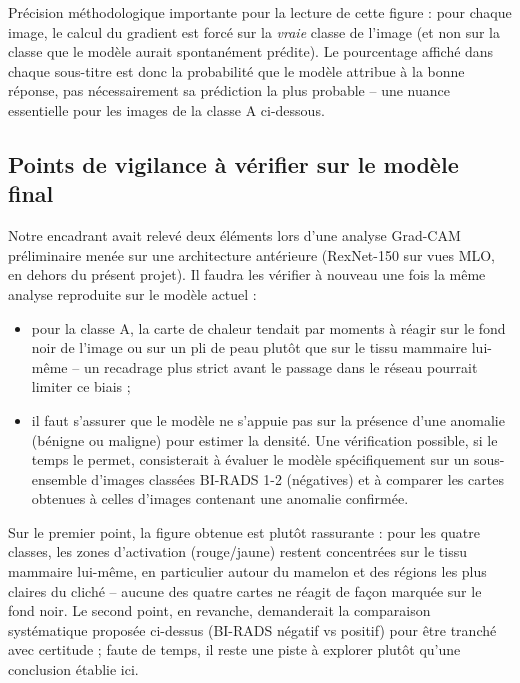 \documentclass[12pt,a4paper]{report}
\begin{document}
Précision méthodologique importante pour la lecture de cette figure : pour
chaque image, le calcul du gradient est forcé sur la \emph{vraie} classe de
l'image (et non sur la classe que le modèle aurait spontanément prédite).
Le pourcentage affiché dans chaque sous-titre est donc la probabilité que
le modèle attribue à la bonne réponse, pas nécessairement sa prédiction la
plus probable -- une nuance essentielle pour les images de la classe A
ci-dessous.

\subsection{Points de vigilance à vérifier sur le modèle final}

Notre encadrant avait relevé deux éléments lors d'une analyse Grad-CAM
préliminaire menée sur une architecture antérieure (RexNet-150 sur vues
MLO, en dehors du présent projet). Il faudra les vérifier à nouveau une
fois la même analyse reproduite sur le modèle actuel :
\begin{itemize}
    \item pour la classe A, la carte de chaleur tendait par moments à
    réagir sur le fond noir de l'image ou sur un pli de peau plutôt que sur
    le tissu mammaire lui-même -- un recadrage plus strict avant le passage
    dans le réseau pourrait limiter ce biais ;
    \item il faut s'assurer que le modèle ne s'appuie pas sur la présence
    d'une anomalie (bénigne ou maligne) pour estimer la densité. Une
    vérification possible, si le temps le permet, consisterait à évaluer le
    modèle spécifiquement sur un sous-ensemble d'images classées BI-RADS 1-2
    (négatives) et à comparer les cartes obtenues à celles d'images
    contenant une anomalie confirmée.
\end{itemize}

Sur le premier point, la figure obtenue est plutôt rassurante : pour les
quatre classes, les zones d'activation (rouge/jaune) restent concentrées
sur le tissu mammaire lui-même, en particulier autour du mamelon et des
régions les plus claires du cliché -- aucune des quatre cartes ne réagit
de façon marquée sur le fond noir. Le second point, en revanche, demanderait
la comparaison systématique proposée ci-dessus (BI-RADS négatif vs positif)
pour être tranché avec certitude ; faute de temps, il reste une piste à
explorer plutôt qu'une conclusion établie ici.
\end{document}
